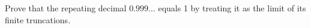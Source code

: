 Prove that the repeating decimal $ 0.999\ldots $ equals 1 by treating it as the limit of its finite truncations.
